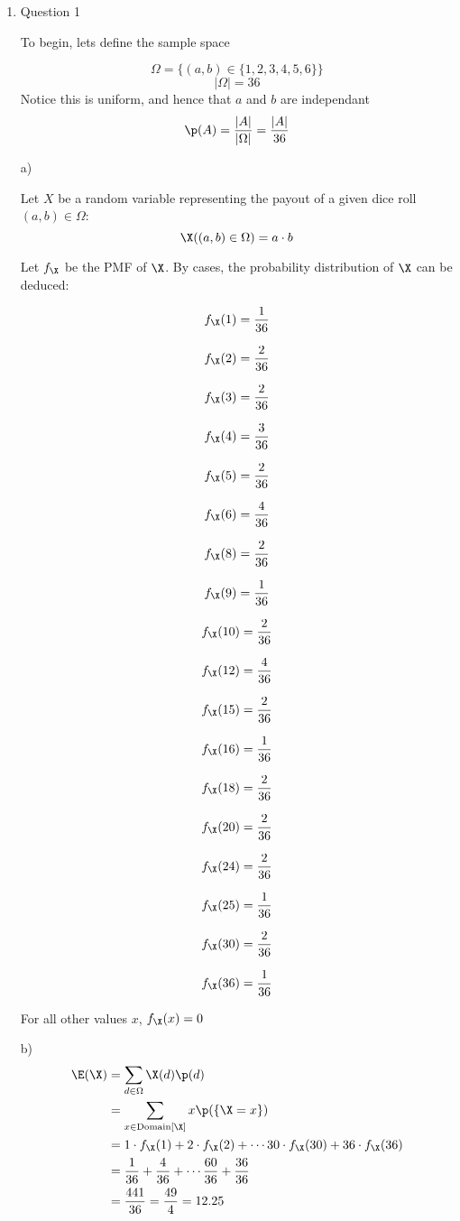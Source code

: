 \begin{enumerate}

\item Question 1

To begin, lets define the sample space

\[
\Omega = \{ (a, b) \in \{ 1, 2, 3, 4, 5, 6 \} \}
\]
\[
|\Omega| = 36
\]
Notice this is uniform, and hence that $a$ and $b$ are independant
\begin{equation}
\label{eq:q1-uniform-p}
\p (A) = \frac{|A|}{|\Omega|} = \frac{|A|}{36}
\end{equation}

a)

Let $X$ be a random variable representing the payout of a given dice roll $(a,b)\in \Omega$:
\[
\X ((a,b) \in \Omega) = a \cdot b
\]


Let $f_{\X}$ be the PMF of $\X$. By cases, the probability distribution of $\X$ can be deduced:
\newcommand{\pq}[2]{
	\[f_{\X}(#1) = \frac{#2}{36}\]
}

\begin{multicols}{3}

\pq{1}{1}
\pq{2}{2}
\pq{3}{2}
\pq{4}{3}
\pq{5}{2}
\pq{6}{4}

\pq{8}{2}
\pq{9}{1}
\pq{10}{2}
\pq{12}{4}
\pq{15}{2}
\pq{16}{1}

\pq{18}{2}
\pq{20}{2}
\pq{24}{2}
\pq{25}{1}
\pq{30}{2}
\pq{36}{1}

\end{multicols}

For all other values $x$, $f_{\X}(x) = 0$

b)
\begin{align}
\E (\X) &= \sum _{d \in \Omega} \X (d) \p (d) \\
&= \sum _{x \in \mathrm{Domain}[\X]} x \p (\{ \X = x\}) \\
&= 1 \cdot f_{\X} (1) + 2 \cdot f_{\X}(2) + \cdots 30 \cdot f_{\X}(30) + 36 \cdot f_{\X}(36) \\
&= \frac{1}{36} + \frac{4}{36} + \cdots \frac{60}{36} + \frac{36}{36} \\
&= \frac{441}{36} = \frac{49}{4} = 12.25
\end{align}

\vspace{0.5cm}


\end{enumerate}
